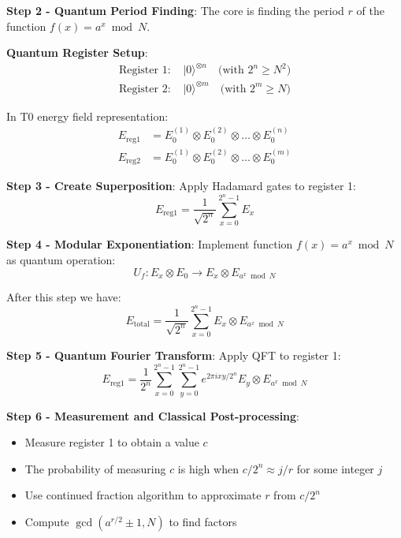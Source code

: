 \documentclass[12pt,a4paper]{article}
\theoremstyle{definition}
\theoremstyle{remark}
\begin{document}
	\textbf{Step 2 - Quantum Period Finding}:
	The core is finding the period $r$ of the function $f(x) = a^x \bmod N$.
	
	\textbf{Quantum Register Setup}:
	\begin{align}
		\text{Register 1: } &|0\rangle^{\otimes n} \quad \text{(with } 2^n \geq N^2\text{)} \\
		\text{Register 2: } &|0\rangle^{\otimes m} \quad \text{(with } 2^m \geq N\text{)}
	\end{align}
	
	In T0 energy field representation:
	\begin{align}
		E_{\text{reg1}} &= E_0^{(1)} \otimes E_0^{(2)} \otimes \ldots \otimes E_0^{(n)} \\
		E_{\text{reg2}} &= E_0^{(1)} \otimes E_0^{(2)} \otimes \ldots \otimes E_0^{(m)}
	\end{align}
	
	\textbf{Step 3 - Create Superposition}:
	Apply Hadamard gates to register 1:
	\begin{equation}
		E_{\text{reg1}} = \frac{1}{\sqrt{2^n}} \sum_{x=0}^{2^n-1} E_x
	\end{equation}
	
	\textbf{Step 4 - Modular Exponentiation}:
	Implement function $f(x) = a^x \bmod N$ as quantum operation:
	\begin{equation}
		U_f: E_x \otimes E_0 \rightarrow E_x \otimes E_{a^x \bmod N}
	\end{equation}
	
	After this step we have:
	\begin{equation}
		E_{\text{total}} = \frac{1}{\sqrt{2^n}} \sum_{x=0}^{2^n-1} E_x \otimes E_{a^x \bmod N}
	\end{equation}
	
	\textbf{Step 5 - Quantum Fourier Transform}:
	Apply QFT to register 1:
	\begin{equation}
		E_{\text{reg1}} = \frac{1}{2^n} \sum_{x=0}^{2^n-1} \sum_{y=0}^{2^n-1} e^{2\pi i xy/2^n} E_y \otimes E_{a^x \bmod N}
	\end{equation}
	
	\textbf{Step 6 - Measurement and Classical Post-processing}:
	\begin{itemize}
		\item Measure register 1 to obtain a value $c$
		\item The probability of measuring $c$ is high when $c/2^n \approx j/r$ for some integer $j$
		\item Use continued fraction algorithm to approximate $r$ from $c/2^n$
		\item Compute $\gcd(a^{r/2} \pm 1, N)$ to find factors
	\end{itemize}
	
\end{document}
